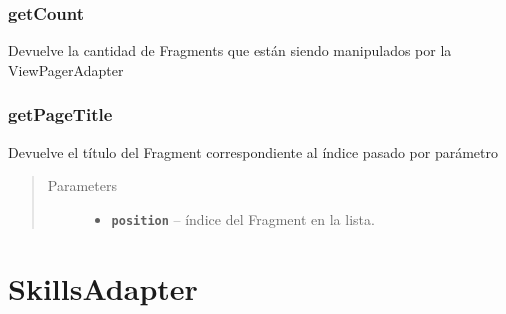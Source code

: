 \documentclass[letterpaper,10pt,english]{sphinxmanual}
\begin{document}
\subsubsection{getCount}
\label{Adapter/ViewPagerAdapter:getcount}

\begin{fulllineitems}
\label{Adapter/ViewPagerAdapter:com.fiuba.tallerii.jobify.ViewPagerAdapter.getCount()}
Devuelve la cantidad de Fragments que están siendo manipulados por la ViewPagerAdapter

\end{fulllineitems}



\subsubsection{getPageTitle}
\label{Adapter/ViewPagerAdapter:getpagetitle}

\begin{fulllineitems}
\label{Adapter/ViewPagerAdapter:com.fiuba.tallerii.jobify.ViewPagerAdapter.getPageTitle(int)}
Devuelve el título del Fragment correspondiente al índice pasado por parámetro
\begin{quote}\begin{description}
\item[{Parameters}] \leavevmode\begin{itemize}
\item {} 
\textbf{\texttt{position}} -- índice del Fragment en la lista.

\end{itemize}

\end{description}\end{quote}

\end{fulllineitems}



\section{SkillsAdapter}
\label{Adapter/SkillsAdapter::doc}\label{Adapter/SkillsAdapter:skillsadapter}
\end{document}
